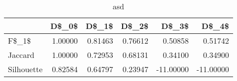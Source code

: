 \begin{table}
\centering
\caption{asd}
\label{asd}
\begin{tabular}{lrrrrr}
\toprule
{} &   D\$\_0\$ &   D\$\_1\$ &   D\$\_2\$ &     D\$\_3\$ &     D\$\_4\$ \\
\midrule
F\$\_1\$      & 1.00000 & 0.81463 & 0.76612 &   0.50858 &   0.51742 \\
Jaccard    & 1.00000 & 0.72953 & 0.68131 &   0.34100 &   0.34900 \\
Silhouette & 0.82584 & 0.64797 & 0.23947 & -11.00000 & -11.00000 \\
\bottomrule
\end{tabular}
\end{table}
